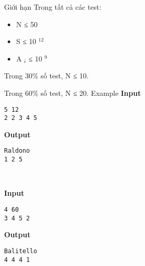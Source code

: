 Giới hạn
Trong tất cả các test:
\begin{itemize}
	\item N ≤ 50
	\item S ≤ 10 $^ 12 $
	\item A $_ i $ ≤ 10 $^ 9 $
\end{itemize}

Trong 30\% số test, N ≤ 10.

Trong 60\% số test, N ≤ 20.
Example
\textbf{Input }
\begin{verbatim}
5 12
2 2 3 4 5\end{verbatim}

\textbf{Output }
\begin{verbatim}
Raldono
1 2 5\end{verbatim}

 

\textbf{Input }
\begin{verbatim}
4 60
3 4 5 2\end{verbatim}

\textbf{Output }
\begin{verbatim}
Balitello
4 4 4 1\end{verbatim}